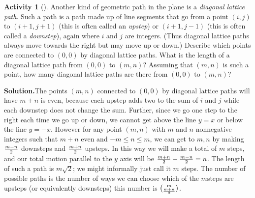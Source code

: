 \documentclass[10pt,]{book}
\theoremstyle{plain}
\theoremstyle{definition}
\newtheorem{activity}[project]{Activity}
\numberwithin{equation}{chapter}
\begin{document}
\begin{activity}[]\label{diagonallattice}
Another kind of geometric path in the plane is a \emph{diagonal lattice path}. Such a path is a path made up of line segments that go from a point \((i,j)\) to \((i+1,j+1)\) (this is often called an \emph{upstep}) or \((i+1,j-1)\) (this is often called a \emph{downstep}), again where \(i\) and \(j\) are integers. (Thus diagonal lattice paths always move towards the right but may move up or down.) Describe which points are connected to \((0,0)\) by diagonal lattice paths. What is the length of a diagonal lattice path from \((0,0)\) to \((m,n)\)? Assuming that \((m,n)\) is such a point, how many diagonal lattice paths are there from \((0,0)\) to \((m,n)\)?%
\par\medskip\noindent%
\textbf{Solution.}\quad The points \((m,n)\) connected to \((0,0)\) by diagonal lattice paths will have \(m+n\) is even, because each upstep adds two to the sum of \(i\) and \(j\) while each downstep does not change the sum.  Further, since we go one step to the right each time we go up or down, we cannot get above the line \(y=x\) or below the line \(y=-x\). However for any point \((m,n)\) with \(m\) and \(n\) nonnegative integers such that \(m+n\) even and \(-m\le n\le m\), we can get to \(m,n\) by making \(m-n\over 2\) downsteps and \(m+n\over2\) upsteps. In this way we will make a total of \(m\) steps, and our total motion parallel to the \(y\) axis will be \({m+n\over2}-{m-n\over2} = n\).  The length of such a path is \(m\sqrt{2}\); we might informally just call it \(m\) steps. The number of possible paths is the number of ways we can choose which of the \(m\)steps are upsteps (or equivalently downsteps) this number is \(m\choose{m+n\over2}\).%
\end{activity}
\end{document}
